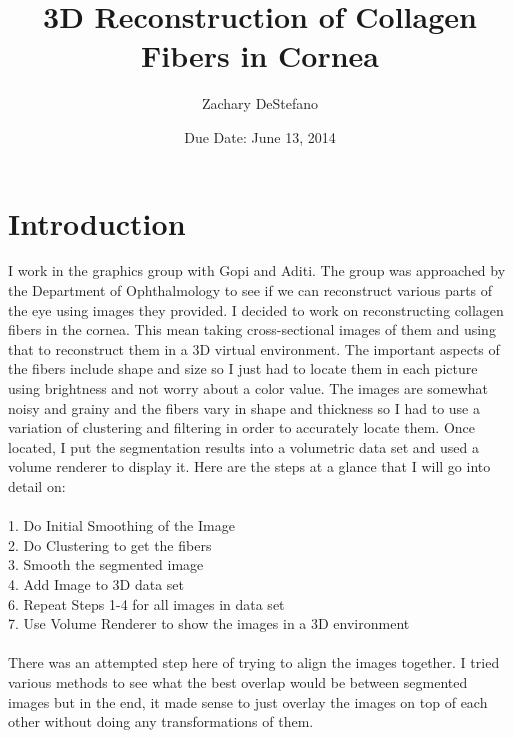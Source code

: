 \documentclass[11pt,psfig]{article}
\begin{document}
\setlength{\parskip}{1.2ex plus0.3ex minus 0.3ex}


\thispagestyle{empty} \pagestyle{myheadings} 



\title{3D Reconstruction of Collagen Fibers in Cornea}
\author{Zachary DeStefano}
\date{Due Date: June 13, 2014}

\maketitle

\vfill\eject

\newpage

\section{Introduction}

I work in the graphics group with Gopi and Aditi. The group was approached by the Department of Ophthalmology to see if we can reconstruct various parts of the eye using images they provided. I decided to work on reconstructing collagen fibers in the cornea. This mean taking cross-sectional images of them and using that to reconstruct them in a 3D virtual environment. The important aspects of the fibers include shape and size so I just had to locate them in each picture using brightness and not worry about a color value. The images are somewhat noisy and grainy and the fibers vary in shape and thickness so I had to use a variation of clustering and filtering in order to accurately locate them. Once located, I put the segmentation results into a volumetric data set and used a volume renderer to display it. Here are the steps at a glance that I will go into detail on: \\
\\
1. Do Initial Smoothing of the Image \\
2. Do Clustering to get the fibers\\
3. Smooth the segmented image\\
4. Add Image to 3D data set\\
6. Repeat Steps 1-4 for all images in data set\\
7. Use Volume Renderer to show the images in a 3D environment\\
\\
There was an attempted step here of trying to align the images together. I tried various methods to see what the best overlap would be between segmented images but in the end, it made sense to just overlay the images on top of each other without doing any transformations of them. 
\end{document}
